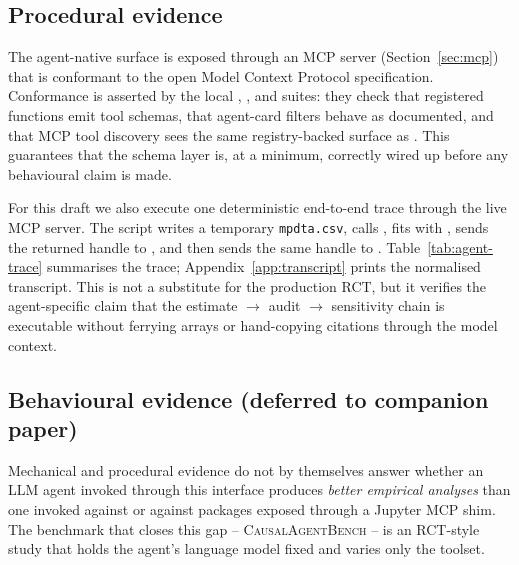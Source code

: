 \subsection{Procedural evidence}\label{sec:agentbench-procedural}

The agent-native surface is exposed through an MCP server
(Section~\ref{sec:mcp}) that is conformant to the open Model Context
Protocol specification. Conformance is asserted by the local
, ,
and  suites: they check that registered
functions emit tool schemas, that agent-card filters behave as
documented, and that MCP tool discovery sees the same registry-backed
surface as . This guarantees that the
schema layer is, at a minimum, correctly wired up before any
behavioural claim is made.

For this draft we also execute one deterministic end-to-end trace
through the live MCP server. The script
 writes a temporary
\texttt{mpdta.csv}, calls , fits
 with , sends the
returned handle to , and then sends the same
handle to . Table~\ref{tab:agent-trace}
summarises the trace; Appendix~\ref{app:transcript} prints the
normalised transcript. This is not a substitute for the production
RCT, but it verifies the agent-specific claim that the estimate
\(\to\) audit \(\to\) sensitivity chain is executable without
ferrying arrays or hand-copying citations through the model context.

\begin{table}[t]
\centering\small
\caption{Deterministic MCP trace generated by
. Ephemeral result
handles are normalised in the appendix transcript.}
\label{tab:agent-trace}

\end{table}

\subsection{Behavioural evidence (deferred to companion paper)}\label{sec:agentbench-behavioural}

Mechanical and procedural evidence do not by themselves answer
whether an LLM agent invoked through this interface produces
\emph{better empirical analyses} than one invoked against
 or against  packages exposed through a
Jupyter MCP shim. The benchmark that closes this gap --
\textsc{CausalAgentBench} -- is an RCT-style study that holds the
agent's language model fixed and varies only the toolset.

